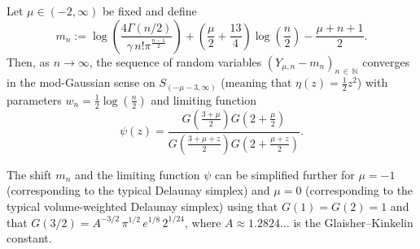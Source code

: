\documentclass[AHL,Unicode,longabstracts,published]{cedram}
\newcommand{\N}{\mathbb{N}}
\begin{document}
\begin{theo}\label{thm:ModPhi}
Let $\mu\in(-2,\infty)$ be fixed and define
\[
m_n:=\log\left(\frac{4\Gamma(n/2)}{\gamma\,n!\pi^{\frac{n-1}{2}}}\right)+\left(\frac{\mu}{2}+\frac{13}{4}\right)\log\left(\frac{n}{2}\right)-\frac{\mu+n+1}{2}.
\]
Then, as $n\to\infty$, the sequence of random variables $(Y_{\mu,n}-m_n)_{n\,\in\,\N}$ converges in the mod-Gaussian sense on $S_{(-\mu-3,\infty)}$ (meaning that $\eta(z)=\frac{1}{2}z^2$) with parameters $w_n=\frac{1}{2}\log\left(\frac{n}{2}\right)$ and limiting function
\begin{equation}\label{eq:DefPsi}
\psi(z)=\frac{G\left(\frac{3+\mu}{2}\right)G\left(2+\frac{\mu}{2}\right)}{G\left(\frac{3+\mu+z}{2}\right) G\left(2+\frac{\mu+z}{2}\right)}.
\end{equation}
\end{theo}

\begin{rema}
The shift $m_n$ and the limiting function $\psi$ can be simplified further for $\mu=-1$ (corresponding to the typical Delaunay simplex) and $\mu=0$ (corresponding to the typical volume-weighted Delaunay simplex) using that $G(1)=G(2)=1$ and that $G(3/2)=A^{-3/2}\,\pi^{1/2}\,e^{1/8}\,2^{1/24}$, where $A\approx 1.2824\ldots$ is the Glaisher--Kinkelin constant.
\end{rema}
\end{document}
